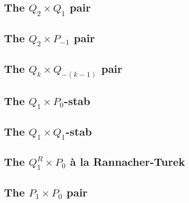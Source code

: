\subsection{The $Q_2 \times Q_1$ pair} \label{ss:pairq2q1}


\subsection{The $Q_2 \times P_{-1}$ pair} \label{ss:pairq2pm1}


\subsection{The $Q_k \times Q_{-(k-1)}$ pair} \label{ss:pair_q2qm1}


\subsection{The $Q_1\times P_0$-stab} \label{ss:pairq1p0stab}


\subsection{The $Q_1\times Q_1$-stab}


\subsection{The ${ Q}_1^R\times P_0$ {\`a} la Rannacher-Turek \label{ss:RTq1p0}}


\subsection{The ${ P}_1\times P_0$ pair} \label{ss:p1p0}


